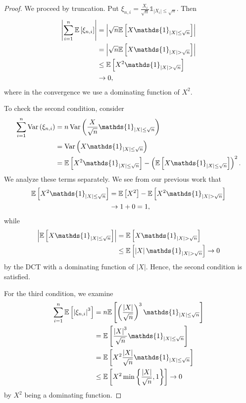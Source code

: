 \begin{proof}
	We proceed by truncation.
	Put $\xi_{n,i} = \frac{X_i}{\sqrt{n} } \mathds{1}_{\left| X_i \right| \le \sqrt{n} }$. Then \begin{align*}
		\left| \sum\limits_{i=1}^{n} \E\left[\xi_{n,i}\right]  \right| 
		&= \left| \sqrt{n} \E\left[X \mathds{1}_{\left| X \right| \le \sqrt{n} }\right]  \right| \\
		&= \left| \sqrt{n} \E\left[X \mathds{1}_{\left| X \right| > \sqrt{n}}\right]  \right| \\
		&\le \E\left[X^2 \mathds{1}_{\left| X \right| > \sqrt{n} }\right]  \\
		&\to 0
	,\end{align*}
	where in the convergence we use a dominating function of $X^2$.

	To check the second condition, consider 
	\begin{align*}
		\sum\limits_{i=1}^{n} \operatorname{Var}\left(\xi_{n,i}\right)
		&= n \operatorname{Var}\left(\frac{X}{\sqrt{n} } \mathds{1}_{\left| X \right| \le \sqrt{n} }\right) \\
		&= \operatorname{Var}\left(X \mathds{1}_{\left| X \right| \le \sqrt{n} }\right) \\
		&= \E\left[X^2 \mathds{1}_{\left| X \right| \le \sqrt{n} }\right]  - \left( \E\left[X \mathds{1}_{\left| X \right| \le \sqrt{n}}\right]  \right)^2
	.\end{align*}
	We analyze these terms separately.
	We see from our previous work that
	\begin{align*}
		\E\left[X^2 \mathds{1}_{\left| X \right| \le \sqrt{n} }\right] &= \E\left[X^2\right]  - \E\left[X^2 \mathds{1}_{\left| X \right| > \sqrt{n}}\right] \\
																	   &\to 1 + 0 = 1
	,\end{align*}
	while 
	\begin{align*}
		\left| \E\left[X \mathds{1}_{\left| X \right|\le \sqrt{n} }\right]  \right|
		&= \E\left[X \mathds{1}_{\left| X \right| > \sqrt{n} }\right]  \\
		&\le \E\left[\left| X \right| \mathds{1}_{\left| X \right| > \sqrt{n} }\right] \to 0
	\end{align*} by the DCT with a dominating function of $\left| X \right|$.
	Hence, the second condition is satisfied.

	For the third condition, we examine
	\begin{align*}
		\sum\limits_{i=1}^{n} \E\left[\left| \xi_{n,i} \right|^3\right] 
		&= n \E\left[\left( \frac{\left| X \right|}{\sqrt{n} } \right)^3 \mathds{1}_{\left| X \right| \le \sqrt{n} }\right]  \\
		&= \E\left[\frac{\left| X \right|^3}{\sqrt{n} } \mathds{1}_{\left| X \right| \le \sqrt{n} }\right] \\
		&= \E\left[X^2 \frac{\left| X \right|}{\sqrt{n} } \mathds{1}_{\left| X \right| \le \sqrt{n} } \right]  \\
		&\le \E\left[X^2 \min \left\{\frac{\left| X \right|}{\sqrt{n} }, 1\right\}\right]  \to 0
	\end{align*}
	by $X^2$ being a dominating function.
	

\end{proof}

